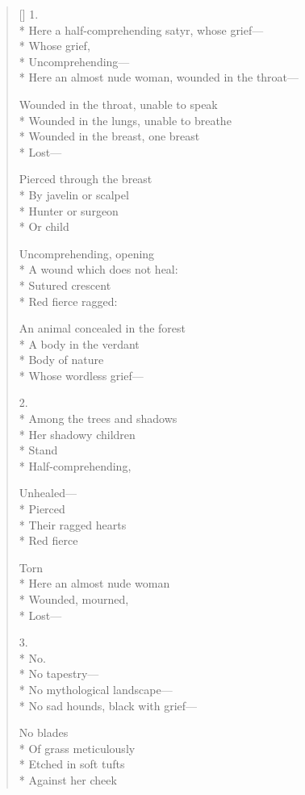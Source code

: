 \begin{verse}[\versewidth]
1.\\*
Here a half-comprehending satyr, whose grief---\\*
Whose grief,\\*
Uncomprehending---\\*
Here an almost nude woman, wounded in the throat---

Wounded in the throat, unable to speak\\*
Wounded in the lungs, unable to breathe\\*
Wounded in the breast, one breast\\*
Lost---

Pierced through the breast\\*
By javelin or scalpel\\*
Hunter or surgeon\\*
Or child

Uncomprehending, opening\\*
A wound which does not heal:\\*
Sutured crescent\\*
Red \quad fierce \quad ragged:

An animal concealed in the forest\\*
A body in the verdant\\*
Body of nature\\*
Whose wordless grief---

2.\\*
Among the trees and shadows\\*
Her shadowy children\\*
Stand\\*
Half-comprehending,

Unhealed---\\*
Pierced\\*
Their ragged hearts\\*
Red \quad fierce

Torn\\*
Here an almost nude woman\\*
Wounded, mourned, \\*
Lost---

3.\\*
No.\\*
No tapestry---\\*
No mythological landscape---\\*
No sad hounds, black with grief---

No blades\\*
Of grass meticulously\\*
Etched in soft tufts \\*
Against her cheek


\end{verse}
